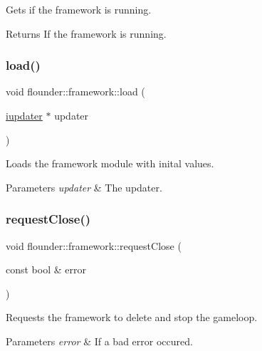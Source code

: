 Gets if the framework is running. 

\begin{DoxyReturn}{Returns}
If the framework is running. 
\end{DoxyReturn}
\mbox{\label{classflounder_1_1framework_a1c6123166e03e5ee0effc375cb7a800c}} 
\subsubsection{\texorpdfstring{load()}{load()}}
{\footnotesize\ttfamily void flounder\+::framework\+::load (\begin{DoxyParamCaption}\item[{\hyperlink{classflounder_1_1iupdater}{iupdater} $\ast$}]{updater }\end{DoxyParamCaption})}



Loads the framework module with inital values. 


\begin{DoxyParams}{Parameters}
{\em updater} & The updater. \\
\hline
\end{DoxyParams}
\mbox{\label{classflounder_1_1framework_ad443bf70cbc62d372cf39939cd7c2e09}} 
\subsubsection{\texorpdfstring{request\+Close()}{requestClose()}}
{\footnotesize\ttfamily void flounder\+::framework\+::request\+Close (\begin{DoxyParamCaption}\item[{const bool \&}]{error }\end{DoxyParamCaption})}



Requests the framework to delete and stop the gameloop. 


\begin{DoxyParams}{Parameters}
{\em error} & If a bad error occured. \\
\hline
\end{DoxyParams}
\mbox{\label{classflounder_1_1framework_aa3a73c8e8f5f0c6ccef3e4de89982434}} 
